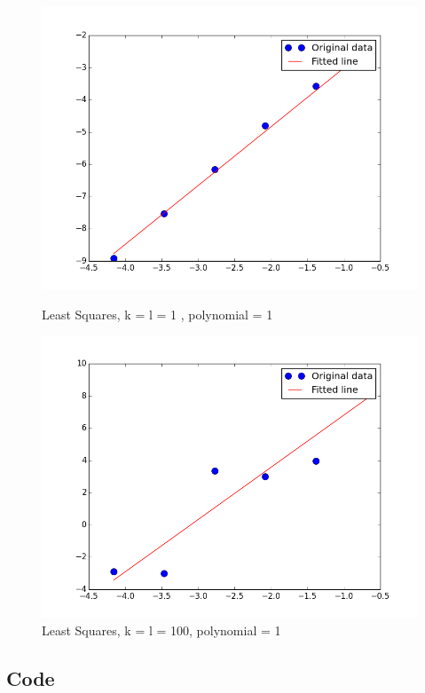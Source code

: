 \documentclass[a4paper,norsk]{article}
\begin{document}
\begin{figure}[h]
    \centering
    \includegraphics[scale=0.5]{least_squares_1_1.png}
    \caption{Least Squares, k = l = 1 , polynomial = 1}
    \label{fig:awesome_image}
    \includegraphics[scale=0.5]{least_squares_1_100.png}
    \caption{Least Squares, k = l = 100, polynomial = 1}
    \label{fig:awesome_image}
\end{figure}





\subsection*{Code}

\end{document}
